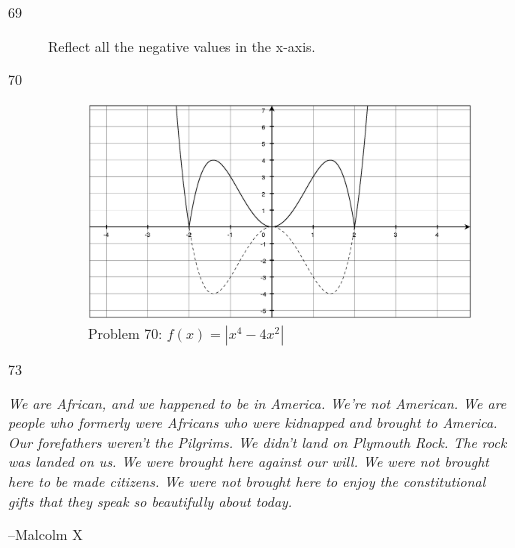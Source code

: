 \documentclass{exam}
\begin{document}
\begin{description}
    \item[69]
      Reflect all the negative values in the x-axis.
      
    \pagebreak

    \item[70]
      \begin{figure}[H]
        \centering
        \includegraphics[scale=.3]{problem_70.eps}
        \caption*{Problem 70:  $f(x) = |x^4 - 4x^2|$ }
      \end{figure}

    \item[73]
  \end{description}
\else
  \vspace{9 cm}

  \emph{
    We are African, and we happened to be in America. We're not American. We are people who formerly were Africans who
    were kidnapped and brought to America. Our forefathers weren't the Pilgrims. We didn't land on Plymouth Rock. The
    rock was landed on us. We were brought here against our will. We were not brought here to be made citizens. We were
    not brought here to enjoy the constitutional gifts that they speak so beautifully about today.
  }

  \vspace{.2 cm}

  \hspace{1 cm} --Malcolm X

\fi
\end{document}
